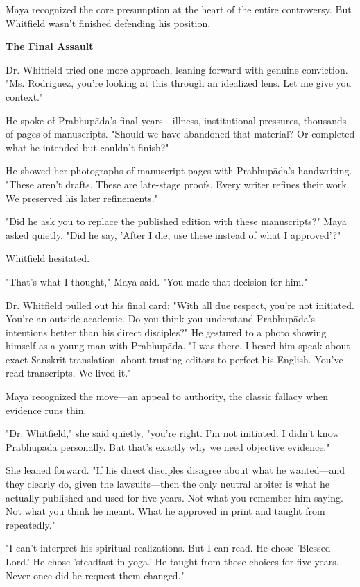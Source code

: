 \documentclass[12pt]{article}
\begin{document}
Maya recognized the core presumption at the heart of the entire controversy. But Whitfield wasn't finished defending his position.


\vspace{0.5cm}
\textbf{The Final Assault}
\vspace{0.2cm}


Dr. Whitfield tried one more approach, leaning forward with genuine conviction. "Ms. Rodriguez, you're looking at this through an idealized lens. Let me give you context."

He spoke of Prabhupāda's final years—illness, institutional pressures, thousands of pages of manuscripts. "Should we have abandoned that material? Or completed what he intended but couldn't finish?"

He showed her photographs of manuscript pages with Prabhupāda's handwriting. "These aren't drafts. These are late-stage proofs. Every writer refines their work. We preserved his later refinements."

"Did he ask you to replace the published edition with these manuscripts?" Maya asked quietly. "Did he say, 'After I die, use these instead of what I approved'?"

Whitfield hesitated.

"That's what I thought," Maya said. "You made that decision for him."

Dr. Whitfield pulled out his final card: "With all due respect, you're not initiated. You're an outside academic. Do you think you understand Prabhupāda's intentions better than his direct disciples?" He gestured to a photo showing himself as a young man with Prabhupāda. "I was there. I heard him speak about exact Sanskrit translation, about trusting editors to perfect his English. You've read transcripts. We lived it."

Maya recognized the move—an appeal to authority, the classic fallacy when evidence runs thin.

"Dr. Whitfield," she said quietly, "you're right. I'm not initiated. I didn't know Prabhupāda personally. But that's exactly why we need objective evidence."

She leaned forward. "If his direct disciples disagree about what he wanted—and they clearly do, given the lawsuits—then the only neutral arbiter is what he actually published and used for five years. Not what you remember him saying. Not what you think he meant. What he approved in print and taught from repeatedly."

"I can't interpret his spiritual realizations. But I can read. He chose 'Blessed Lord.' He chose 'steadfast in yoga.' He taught from those choices for five years. Never once did he request them changed."
\end{document}
